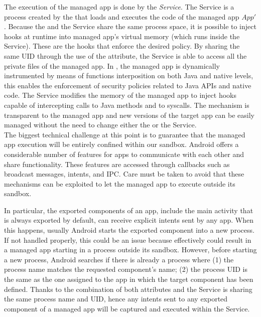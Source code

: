 The execution of the managed app is done by the \textit{\asd Service}. The \asd Service is a process created by the \stub that loads and executes the code of the managed app $App'$. Because the \stub and the \asd Service share the same process space, it is possible to inject hooks at runtime into managed app's virtual memory (which runs inside the \asd Service). These are the hooks that enforce the desired policy. By sharing the same UID through the use of the \shared attribute, the \asd Service is able to access all the private files of the managed app. In \asd, the managed app is dynamically instrumented by means of functions interposition on both Java and native levels, this enables the enforcement of security policies related to Java APIs and native code. The \asd Service modifies the memory of the managed app to inject hooks capable of intercepting calls to Java methods and to syscalls. The  mechanism is transparent to the managed app and new versions of the target app can be easily managed without the need to change either the \stub or the \asd Service. \\

The biggest technical challenge at this point is to guarantee that the managed app execution will be entirely confined within our sandbox. Android  offers a considerable number of features for apps to communicate with each other and share functionality. These features are accessed through callbacks such as broadcast messages, intents, and IPC. Care must be taken to avoid that these mechanisms can be exploited to let the managed app to execute outside its  sandbox.

In particular,  the exported components of an app, include the main activity that is always exported by default, can receive explicit intents sent by any app. When this happens, usually Android starts the exported component into  a new process. If not handled properly, this could be an issue because effectively could result in a managed app starting in a process outside its sandbox. However, before starting a new process, Android searches if there is already a process where (1) the process name matches the requested component's name; (2)  the process UID is the same as the one assigned to the app in which the target component has been defined. Thanks to the combination of both attributes \shared and \proc the \asd Service is sharing the same process name and UID, hence any intents sent to any exported component of a managed app will be captured and executed within the \asd Service.    



